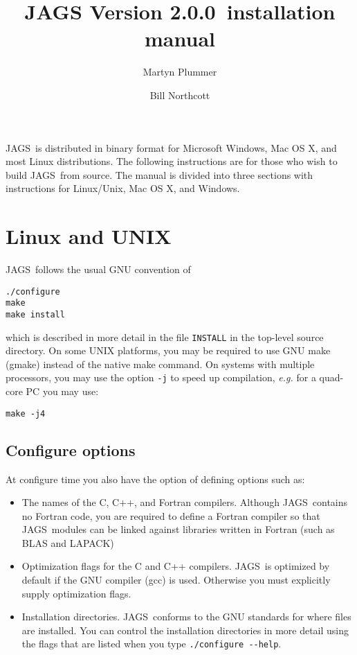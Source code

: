 \documentclass[11pt, a4paper, titlepage]{article}
\newcommand{\release}{2.0.0}
\newcommand{\JAGS}{\textsf{JAGS}}
\begin{document}
\title{JAGS Version \release\ installation manual}
\author{Martyn Plummer \and Bill Northcott}
\maketitle

\JAGS\ is distributed in binary format for Microsoft Windows, Mac OS
X, and most Linux distributions.  The following instructions are for
those who wish to build \JAGS\ from source. The manual is divided
into three sections with instructions for Linux/Unix, Mac OS X, and Windows.

\section{Linux and UNIX}

\JAGS\ follows the usual GNU convention of 
\begin{verbatim}
./configure
make
make install
\end{verbatim}
which is described in more detail in the file \texttt{INSTALL} in
the top-level source directory. On some UNIX platforms, you may
be required to use GNU make (gmake) instead of the native make
command. On systems with multiple processors, you may use the option 
\verb+-j+ to speed up compilation, {\em e.g.} for a quad-core PC you
may use:
\begin{verbatim}
make -j4
\end{verbatim}

\subsection{Configure options}

At configure time you also have the option of defining options such
as:
\begin{itemize}
\item The names of the C, C++, and Fortran compilers.  Although
  \JAGS\ contains no Fortran code, you are required to define a
  Fortran compiler so that \JAGS\ modules can be linked against
  libraries written in Fortran (such as BLAS and LAPACK)
\item Optimization flags for the C and C++ compilers.  \JAGS\ is
  optimized by default if the GNU compiler (gcc) is used. Otherwise
  you must explicitly supply optimization flags.
\item Installation directories. \JAGS\ conforms to the GNU standards
  for where files are installed. You can control the installation
  directories in more detail using the flags that are listed when
  you type \verb+./configure --help+.
\end{itemize}
\end{document}
